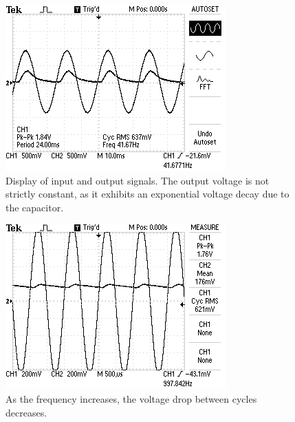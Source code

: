\documentclass[twocolumn,english]{IEEEtran}
\begin{document}
\begin{figure}[h]
  \begin{centering}
  \begin{center}
  \includegraphics[width=\linewidth]{./DC1.png}
  \caption{Display of input and output signals. The output voltage is not strictly constant, as it exhibits an exponential voltage decay due to the capacitor.}
  \label{fig:DC1}
  \end{center}
  \par\end{centering}
\end{figure}

\begin{figure}[h]
  \begin{centering}
  \begin{center}
  \includegraphics[width=\linewidth]{./DC2.png}
  \caption{As the frequency increases, the voltage drop between cycles decreases.}
  \label{fig:DC2}
  \end{center}
  \par\end{centering}
\end{figure}
\end{document}
